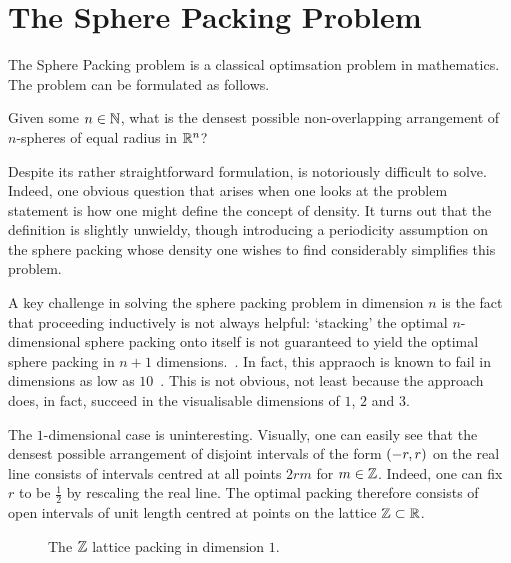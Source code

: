 \section{The Sphere Packing Problem}

The Sphere Packing problem is a classical optimsation problem in mathematics. The problem can be formulated as follows.

\begin{boxproblem}\label{Ch1:Prob:SpherePacking_n}
    Given some $n \in \mathbb{N}$, what is the densest possible non-overlapping arrangement of $n$-spheres of equal radius in $\mathbb{R}^n$?
\end{boxproblem}

Despite its rather straightforward formulation,  is notoriously difficult to solve. Indeed, one obvious question that arises when one looks at the problem statement is how one might define the concept of density. It turns out that the definition is slightly unwieldy, though introducing a periodicity assumption on the sphere packing whose density one wishes to find considerably simplifies this problem.

A key challenge in solving the sphere packing problem in dimension $n$ is the fact that proceeding inductively is not always helpful: `stacking' the optimal $n$-dimensional sphere packing onto itself is not guaranteed to yield the optimal sphere packing in $n + 1$ dimensions.~\cite{CohnOnViazovskaICM}. In fact, this appraoch is known to fail in dimensions as low as $10$~\cite{CohnOnViazovskaAMS}. This is not obvious, not least because the approach does, in fact, succeed in the visualisable dimensions of $1$, $2$ and $3$.

The $1$-dimensional case is uninteresting. Visually, one can easily see that the densest possible arrangement of disjoint intervals of the form $\left( -r, r \right)$ on the real line consists of intervals centred at all points $2rm$ for $m \in \mathbb{Z}$. Indeed, one can fix $r$ to be $\frac{1}{2}$ by rescaling the real line. The optimal packing therefore consists of open intervals of unit length centred at points on the lattice $\mathbb{Z} \subset \mathbb{R}$.

\begin{figure}[htb]
    \centering
    \caption{The $\mathbb{Z}$ lattice packing in dimension $1$.}
    \label{Ch1:Fig:Z_Lattice_Packing_1D}
\end{figure}

